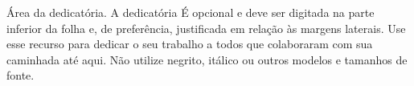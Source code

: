 \begin{dedicatoria}
   \vspace*{\fill}
   \begin{flushright} 
        \parbox{0.48\linewidth}{
		Área da dedicatória. A dedicatória É opcional e deve ser digitada na parte inferior da folha e, de preferência, justificada em relação às margens laterais. Use esse recurso para dedicar o seu trabalho a todos que colaboraram com sua caminhada até aqui. Não utilize negrito, itálico ou outros modelos e tamanhos de fonte.
	}
   \end{flushright} 
   \vspace{2cm}
\end{dedicatoria}